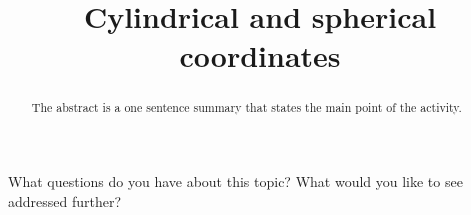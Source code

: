 \documentclass{ximera}
\title{Cylindrical and spherical coordinates}
\begin{document}
\begin{abstract}
  The abstract is a one sentence summary that states the main point of the activity.
\end{abstract}

\maketitle



What questions do you have about this topic?  What would you like to see addressed further?
\begin{free-response}
\end{free-response}
\end{document}
